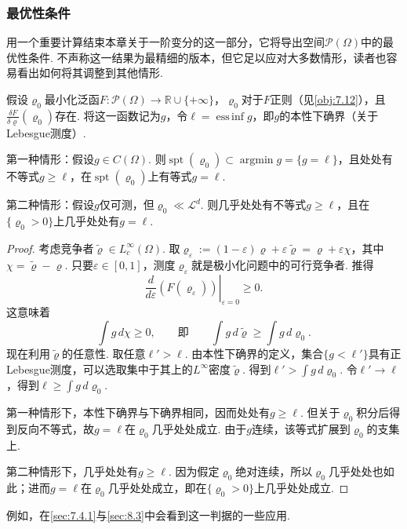 \subsubsection{最优性条件}\label{sec:7.2.3}
用一个重要计算结束本章关于一阶变分的这一部分，它将导出空间$\mathscr P(\Omega)$中的最优性条件. 不声称这一结果为最精细的版本，但它足以应对大多数情形，读者也容易看出如何将其调整到其他情形.
\begin{proposition}\label{obj:7.20}
假设$\varrho_0$最小化泛函$F:\mathscr P(\Omega)\to\mathbb R\cup\{+\infty\}$，$\varrho_0$对于$F$正则（见\autoref{obj:7.12}），且$\frac{\delta F}{\delta\varrho}(\varrho_0)$存在. 将这一函数记为$g$，令$\ell=\operatorname*{ess\,inf}g$，即$g$的本性下确界（关于Lebesgue测度）.

第一种情形：假设$g\in C(\Omega)$. 则$\operatorname{spt}(\varrho_0)\subset\operatorname*{argmin}g=\{g=\ell\}$，且处处有不等式$g\geq\ell$，在$\operatorname{spt}(\varrho_0)$上有等式$g=\ell$.

第二种情形：假设$g$仅可测，但$\varrho_0\ll\mathscr L^d$. 则几乎处处有不等式$g\geq\ell$，且在$\{\varrho_0>0\}$上几乎处处有$g=\ell$.
\end{proposition}
\begin{proof}
考虑竞争者$\widetilde\varrho\in L_c^\infty(\Omega)$. 取$\varrho_\varepsilon:=(1-\varepsilon)\varrho+\varepsilon\widetilde\varrho=\varrho+\varepsilon\chi$，其中$\chi=\widetilde\varrho-\varrho$. 只要$\varepsilon\in[0,1]$，测度$\varrho_\varepsilon$就是极小化问题中的可行竞争者. 推得
\[
 \left.\frac d{d\varepsilon}(F(\varrho_\varepsilon))\right|_{\varepsilon=0}\geq0.
\]
这意味着
\[
 \int g\,d\chi\geq0,\qquad\text{即}\qquad
       \int g\,d\widetilde\varrho\geq\int g\,d\varrho_0.
\]
现在利用$\widetilde\varrho$的任意性. 取任意$\ell'>\ell$. 由本性下确界的定义，集合$\{g<\ell'\}$具有正Lebesgue测度，可以选取集中于其上的$L^\infty$密度$\widetilde\varrho$. 得到$\ell'>\int g\,d\varrho_0$. 令$\ell'\to\ell$，得到$\ell\geq\int g\,d\varrho_0$.

第一种情形下，本性下确界与下确界相同，因而处处有$g\geq\ell$. 但关于$\varrho_0$积分后得到反向不等式，故$g=\ell$在$\varrho_0$几乎处处成立. 由于$g$连续，该等式扩展到$\varrho_0$的支集上.

第二种情形下，几乎处处有$g\geq\ell$. 因为假定$\varrho_0$绝对连续，所以$\varrho_0$几乎处处也如此；进而$g=\ell$在$\varrho_0$几乎处处成立，即在$\{\varrho_0>0\}$上几乎处处成立.
\end{proof}
例如，在\autoref{sec:7.4.1}与\autoref{sec:8.3}中会看到这一判据的一些应用.

